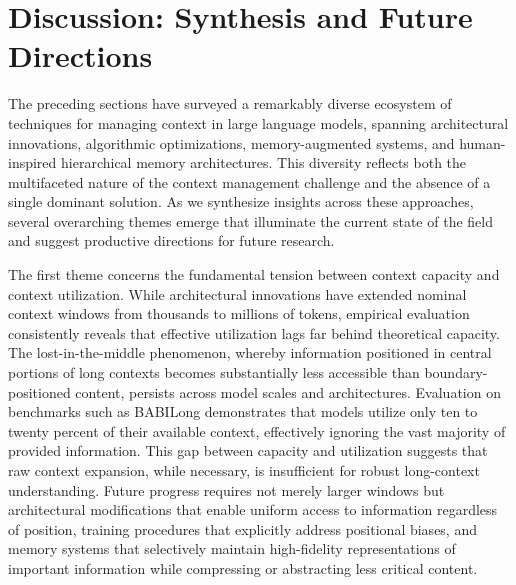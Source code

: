\documentclass[11pt,letterpaper]{article}
\begin{document}
\section{Discussion: Synthesis and Future Directions}
\label{sec:discussion}

The preceding sections have surveyed a remarkably diverse ecosystem of techniques for managing context in large language models, spanning architectural innovations, algorithmic optimizations, memory-augmented systems, and human-inspired hierarchical memory architectures. This diversity reflects both the multifaceted nature of the context management challenge and the absence of a single dominant solution. As we synthesize insights across these approaches, several overarching themes emerge that illuminate the current state of the field and suggest productive directions for future research.

The first theme concerns the fundamental tension between context capacity and context utilization. While architectural innovations have extended nominal context windows from thousands to millions of tokens, empirical evaluation consistently reveals that effective utilization lags far behind theoretical capacity. The lost-in-the-middle phenomenon, whereby information positioned in central portions of long contexts becomes substantially less accessible than boundary-positioned content, persists across model scales and architectures. Evaluation on benchmarks such as BABILong demonstrates that models utilize only ten to twenty percent of their available context, effectively ignoring the vast majority of provided information. This gap between capacity and utilization suggests that raw context expansion, while necessary, is insufficient for robust long-context understanding. Future progress requires not merely larger windows but architectural modifications that enable uniform access to information regardless of position, training procedures that explicitly address positional biases, and memory systems that selectively maintain high-fidelity representations of important information while compressing or abstracting less critical content.
\end{document}
